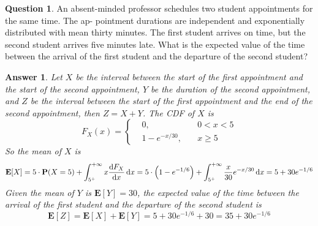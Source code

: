 \documentclass[utf8]{article}
\theoremstyle{definition}%
\newtheorem{question}{Question} %
\theoremstyle{plain}%
\newtheorem{answer}{Answer} %
\begin{document}
\begin{question}
    An absent-minded professor schedules two student appointments for the same time. The ap- pointment durations are independent and exponentially distributed with mean thirty minutes. The first student arrives on time, but the second student arrives five minutes late. What is the expected value of the time between the arrival of the first student and the departure of the second student?
\end{question}
\begin{answer}
    Let $X$ be the interval between the start of the first appointment and the start of the second appointment, $Y$ be the duration of the second appointment, and $Z$ be the interval between the start of the first appointment and the end of the second appointment, then $Z = X + Y$. The CDF of $X$ is
    \begin{equation}
        F_{X}(x) = \left\{\begin{aligned}
            &0, \quad &0 < x < 5 \\
            &1 - e^{-x/30}, \quad &x \geq 5
        \end{aligned}\right.
    \end{equation}
    So the mean of $X$ is
    \begin{equation}
        \mathbf{E}[X] = 5 \cdot \mathbf{P}(X = 5) + \int_{5^+}^{+\infty} x \dv{F_{X}}{x} \dd{x} = 5 \cdot \left(1 - e^{-1/6}\right) + \int_{5^+}^{+\infty} \frac{x}{30} e^{-x/30} \dd{x} = 5 + 30e^{-1/6}
    \end{equation}
    Given the mean of $Y$ is $\mathbf{E}[Y] = 30$, the expected value of the time between the arrival of the first student and the departure of the second student is
    \begin{equation}
        \mathbf{E}[Z] = \mathbf{E}[X] + \mathbf{E}[Y] = 5 + 30e^{-1/6} + 30 = 35 + 30e^{-1/6}
    \end{equation}
\end{answer}
\end{document}
